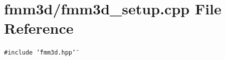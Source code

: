 \section{fmm3d/fmm3d\_\-setup.cpp File Reference}
\label{fmm3d__setup_8cpp}


{\tt \#include \char`\"{}fmm3d.hpp\char`\"{}}\par
